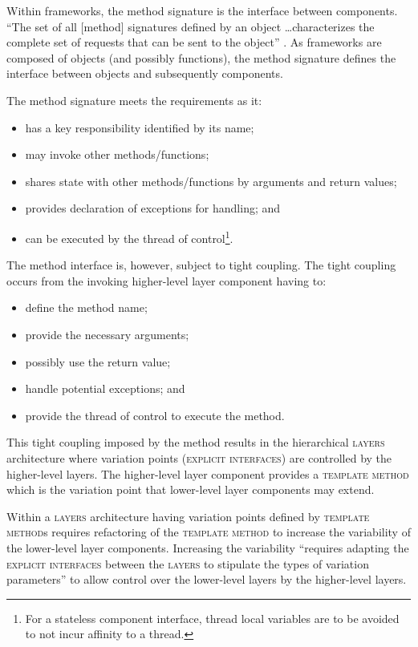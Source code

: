\documentclass[prodmode]{style/acmlarge}
\begin{document}
Within frameworks, the method signature is the interface between components. 
``The set of all [method] signatures defined by an object \ldots characterizes
the complete set of requests that can be sent to the object'' \cite[p. 13]{gof}.
 As frameworks are composed of objects (and possibly functions), the method
signature defines the interface between objects and subsequently components.

The method signature meets the requirements as it:
\begin{itemize}
  \item has a key responsibility identified by its name;
  \item may invoke other methods/functions;
  \item shares state with other methods/functions by arguments and return values;
  \item provides declaration of exceptions for handling; and
  \item can be executed by the thread of control\footnote{For a stateless component interface, thread local variables are to be avoided to not incur affinity to a thread.}.
\end{itemize}

The method interface is, however, subject to tight coupling.  The tight
coupling occurs from the invoking higher-level layer component having to:
\begin{itemize}
  \item define the method name;
  \item provide the necessary arguments;
  \item possibly use the return value;
  \item handle potential exceptions; and
  \item provide the thread of control to execute the method.
\end{itemize}

This tight coupling imposed by the method results in the hierarchical
\textsc{layers} architecture where variation points (\textsc{explicit
interfaces}) are controlled by the higher-level layers.  The higher-level layer
component provides a \textsc{template method} \cite{gof} which is the variation
point that lower-level layer components may extend.

Within a \textsc{layers} architecture having variation points defined by
\textsc{template method}s requires refactoring of the \textsc{template method}
to increase the variability of the lower-level layer components.  Increasing the
variability ``requires adapting the \textsc{explicit interfaces} between the
\textsc{layers} to stipulate the types of variation parameters'' \cite[p.
5]{ioc} to allow control over the lower-level layers by the higher-level layers.
\end{document}
